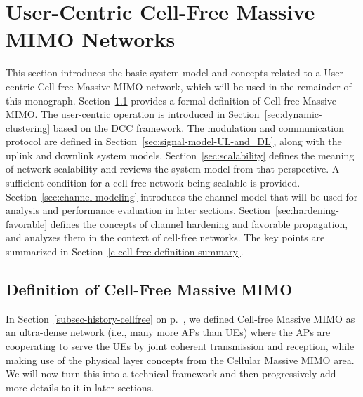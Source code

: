

\chapter{User-Centric Cell-Free Massive MIMO Networks}
\label{c-cell-free-definition} 

This section introduces the basic system model and concepts related to a User-centric Cell-free Massive MIMO network, which will be used in the remainder of this monograph. Section~\ref{def:cell-free-Massive-MIMO} provides a formal definition of Cell-free Massive MIMO. The user-centric operation is introduced in Section~\ref{sec:dynamic-clustering} based on the \gls{DCC} framework. The modulation and communication protocol are defined in Section~\ref{sec:signal-model-UL-and_DL}, along with the uplink and downlink system models. Section~\ref{sec:scalability} defines the meaning of network scalability and reviews the system model from that perspective. A sufficient condition for a cell-free network being scalable is provided. Section~\ref{sec:channel-modeling} introduces the channel model that will be used for analysis and performance evaluation in later sections. Section~\ref{sec:hardening-favorable} defines the concepts of channel hardening and favorable propagation, and analyzes them in the context of cell-free networks.
The key points are summarized in Section~\ref{c-cell-free-definition-summary}.

\enlargethispage{\baselineskip} 

\section{Definition of Cell-Free Massive MIMO}\label{def:cell-free-Massive-MIMO}

In Section~\ref{subsec-history-cellfree} on p.~\pageref{subsec-history-cellfree}, we defined Cell-free Massive MIMO as an ultra-dense network (i.e., many more APs than UEs) where the APs are cooperating to serve the UEs by joint coherent transmission and reception, while making use of the physical layer concepts from the Cellular Massive MIMO area. We will now turn this into a technical framework and then progressively add more details to it in later sections.



